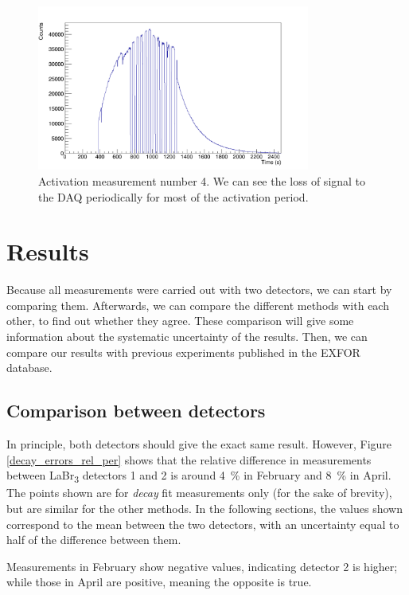\documentclass[a4paper,12pt]{report}
\begin{document}
\begin{figure}[H]
	\centering
	\includegraphics[width=0.80\textwidth]{activation_4_time.png}
	\caption{Activation measurement number 4.
	We can see the loss of signal to the DAQ periodically for most of the activation period.}
	\label{activation_4_time}
\end{figure}

\section{Results}
Because all measurements were carried out with two detectors, we can start by comparing them.
Afterwards, we can compare the different methods with each other, to find out whether they agree.
These comparison will give some information about the systematic uncertainty of the results.
Then, we can compare our results with previous experiments published in the EXFOR database.	%

\subsection{Comparison between detectors}
In principle, both detectors should give the exact same result.
However, Figure \ref{decay_errors_rel_per} shows that the relative difference in measurements between LaBr\textsubscript{3} detectors 1 and 2 is around \qty{4}{\percent} in February and \qty{8}{\percent} in April.
The points shown are for \textit{decay} fit measurements only (for the sake of brevity), but are similar for the other methods.
In the following sections, the values shown correspond to the mean between the two detectors, with an uncertainty equal to half of the difference between them.

Measurements in February show negative values, indicating detector 2 is higher; while those in April are positive, meaning the opposite is true.
\\
\end{document}

